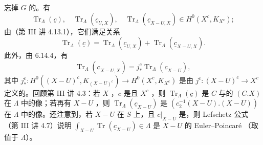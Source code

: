 忘掉 $G$ 的。有
\begin{equation}\operatorname{Tr}_\Lambda(\underline c),\quad\operatorname{Tr}_\Lambda(\underline c_{U,X}),\quad\operatorname{Tr}_\Lambda(\underline c_{X-U,X})\in H^0(X^c,K_{X^c});\tag{6.14.5}\end{equation}
由（第 III 讲 4.13.1），它们满足关系
\begin{equation}\operatorname{Tr}_\Lambda(\underline c)=\operatorname{Tr}_\Lambda(\underline c_{U,X})+\operatorname{Tr}_\Lambda(\underline c_{X-U,X}).\tag{6.14.6}\end{equation}
此外，由 6.14.4，有
\begin{equation}\operatorname{Tr}_\Lambda(\underline c_{X-U,X})=j_*^c\operatorname{Tr}_\Lambda(\underline c_{X-U}),\tag{6.14.7}\end{equation}
其中 $j_*^c:H^0((X-U)^c,K_{(X-U)^c})\to H^0(X^c,K_{X^c})$ 是由 $j^c:(X-U)^c\to X^c$ 定义的。回顾第 III 讲 4.3：若 $X$ ，$c$ 是且 $X^c$ ，则 $\operatorname{Tr}_\Lambda(\underline c)$ 是 $C$ 与的 $(C.X)$ 在 $\Lambda$ 中的像；若再有 $X-U$ ，则 $\operatorname{Tr}_\Lambda(\underline c_{X-U})$ 是 $(c_2^{-1}(X-U).(X-U))$ 在 $\Lambda$ 中的像。还注意到，若 $X-U$ 在 $S$ 上，且 $c|_{X-U}$ 是，则 Lefschetz 公式
（第 III 讲 4.7）说明 $\int_{X-U}\operatorname{Tr}(\underline c_{X-U})\in\Lambda$ 是 $X-U$ 的 Euler--Poincaré （取值于 $\Lambda$）。

